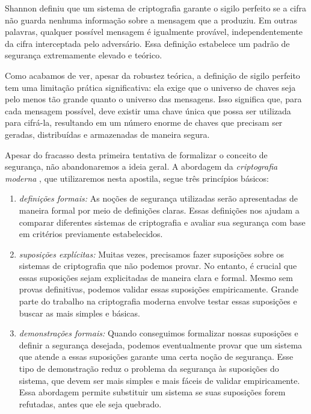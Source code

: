 Shannon definiu que um sistema de criptografia garante o sigilo perfeito se a cifra não guarda nenhuma informação sobre a mensagem que a produziu.
Em outras palavras, qualquer possível mensagem é igualmente provável, independentemente da cifra interceptada pelo adversário.
Essa definição estabelece um padrão de segurança extremamente elevado e teórico.

Como acabamos de ver, apesar da robustez teórica, a definição de sigilo perfeito tem uma limitação prática significativa:
ela exige que o universo de chaves seja pelo menos tão grande quanto o universo das mensagens.
Isso significa que, para cada mensagem possível, deve existir uma chave única que possa ser utilizada para cifrá-la, resultando em um número enorme de chaves que precisam ser geradas, distribuídas e armazenadas de maneira segura.

Apesar do fracasso desta primeira tentativa de formalizar o conceito de segurança, não abandonaremos a ideia geral.
A abordagem da {\em criptografia moderna} \cite{Goldwasser84}, que utilizaremos nesta apostila, segue três princípios básicos:
\begin{enumerate}
\item {\em definições formais:}
  As noções de segurança utilizadas serão apresentadas de maneira formal por meio de definições claras.
  Essas definições nos ajudam a comparar diferentes sistemas de criptografia e avaliar sua segurança com base em critérios previamente estabelecidos.
\item {\em suposições explícitas:}
  Muitas vezes, precisamos fazer suposições sobre os sistemas de criptografia que não podemos provar.
  No entanto, é crucial que essas suposições sejam explicitadas de maneira clara e formal.
  Mesmo sem provas definitivas, podemos validar essas suposições empiricamente.
  Grande parte do trabalho na criptografia moderna envolve testar essas suposições e buscar as mais simples e básicas.
\item {\em demonstrações formais:}
  Quando conseguimos formalizar nossas suposições e definir a segurança desejada, podemos eventualmente provar que um sistema que atende a essas suposições garante uma certa noção de segurança.
  Esse tipo de demonstração reduz o problema da segurança às suposições do sistema, que devem ser mais simples e mais fáceis de validar empiricamente.
  Essa abordagem permite substituir um sistema se suas suposições forem refutadas, antes que ele seja quebrado.
\end{enumerate}


